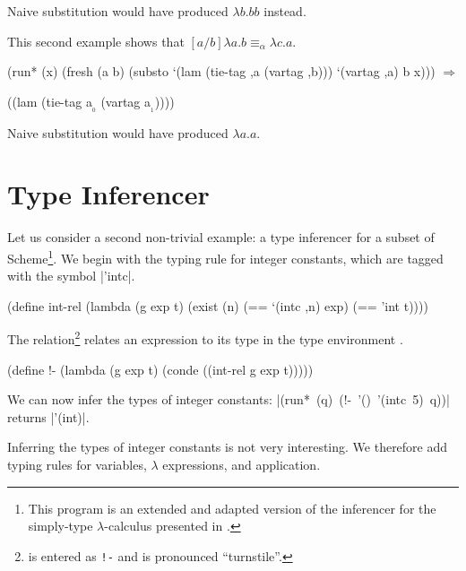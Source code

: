 \noindent Naive substitution would have produced $\lambda b.bb$ instead.

This second example shows that $[a/b]\lambda a.b \equiv _{\alpha} \lambda c.a$.

\schemedisplayspace
\begin{schemedisplay}
(run* (x)
  (fresh (a b)
    (substo `(lam (tie-tag ,a (vartag ,b))) `(vartag ,a) b x))) $\Rightarrow$
\end{schemedisplay}
\nspace
\begin{schemeresponse}
((lam (tie-tag a$_{_{0}}$ (vartag a$_{_{1}}$))))
\end{schemeresponse}

\noindent Naive substitution would have produced $\lambda a.a$.


\section{Type Inferencer}\label{aktypeinf}

Let us consider a second non-trivial \alphakanrensp example: a type
inferencer for a subset of Scheme\footnote{This program is an extended
  and adapted version of the inferencer for the simply-type
  $\lambda$-calculus presented in \citet{CheneyU04}.}.  We begin with
the typing rule for integer constants, which are tagged with the
symbol \scheme|'intc|.

\schemedisplayspace
\begin{schemedisplay}
(define int-rel
  (lambda (g exp t)
    (exist (n)
      (== `(intc ,n) exp)
      (== 'int t))))
\end{schemedisplay}

\noindent The \scheme{!-} relation\footnote{\scheme{!-} is entered as
  {\tt !-} and is pronounced ``turnstile''.}  relates an expression
 to its type  in the type environment
.

\schemedisplayspace
\begin{schemedisplay}
(define !-
  (lambda (g exp t)
    (conde
      ((int-rel g exp t)))))
\end{schemedisplay}

\noindent We can now infer the types of integer constants: 
\mbox{\scheme|(run* (q) (!- '() '(intc 5) q))|} returns \scheme|'(int)|.

Inferring the types of integer constants is not very interesting.  We
therefore add typing rules for variables, $\lambda$ expressions, and
application.

